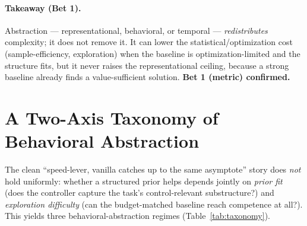 \documentclass{article}
\begin{document}
\paragraph{Takeaway (Bet 1).}
Abstraction --- representational, behavioral, or temporal --- \emph{redistributes}
complexity; it does not remove it. It can lower the statistical/optimization cost
(sample-efficiency, exploration) when the baseline is optimization-limited and the
structure fits, but it never raises the representational ceiling, because a strong
baseline already finds a value-sufficient solution. \textbf{Bet 1 (metric)
confirmed.}

\section{A Two-Axis Taxonomy of Behavioral Abstraction}
\label{sec:taxonomy}

The clean ``speed-lever, vanilla catches up to the same asymptote'' story does
\emph{not} hold uniformly: whether a structured prior helps depends jointly on
\emph{prior fit} (does the controller capture the task's control-relevant
substructure?) and \emph{exploration difficulty} (can the budget-matched baseline
reach competence at all?). This yields three behavioral-abstraction regimes
(Table~\ref{tab:taxonomy}).

\begin{table}[t]
\centering
\caption{Two-axis taxonomy of behavioral abstraction (prior fit $\times$
exploration difficulty). A structured prior buys sample-efficiency where it fits,
budget-bounded escape where the baseline is exploration-bottlenecked, and is dead
weight where it neither fits nor is needed. Source: \texttt{SYNTHESIS\_beat\_ppo.md}.}
\label{tab:taxonomy}
\end{table}
\end{document}
